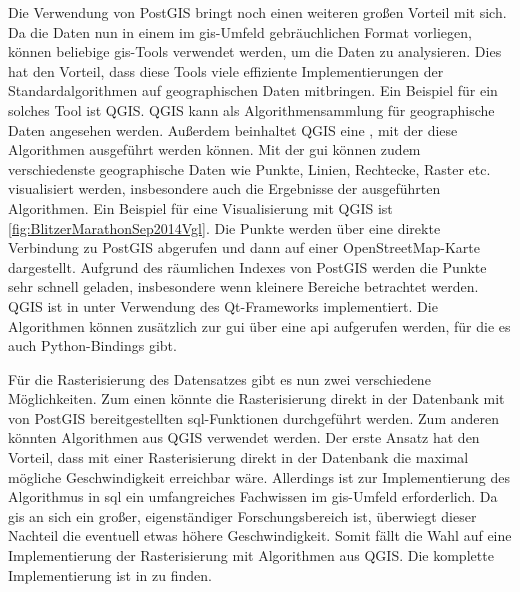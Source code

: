 Die Verwendung von PostGIS bringt noch einen weiteren großen Vorteil mit sich.
Da die Daten nun in einem im \acrshort{gis}-Umfeld gebräuchlichen Format vorliegen, können beliebige \acrshort{gis}-Tools verwendet werden, um die Daten zu analysieren.
Dies hat den Vorteil, dass diese Tools viele effiziente Implementierungen der Standardalgorithmen auf geographischen Daten mitbringen.
Ein Beispiel für ein solches Tool ist QGIS.
QGIS kann als Algorithmensammlung für geographische Daten angesehen werden.
Außerdem beinhaltet QGIS eine , mit der diese Algorithmen ausgeführt werden können.
Mit der \acrshort{gui} können zudem verschiedenste geographische Daten wie Punkte, Linien, Rechtecke, Raster etc. visualisiert werden, insbesondere auch die Ergebnisse der ausgeführten Algorithmen.
Ein Beispiel für eine Visualisierung mit QGIS ist \autoref{fig:BlitzerMarathonSep2014Vgl}.
Die Punkte werden über eine direkte Verbindung zu PostGIS abgerufen und dann auf einer OpenStreetMap-Karte dargestellt.
Aufgrund des räumlichen Indexes von PostGIS werden die Punkte sehr schnell geladen, insbesondere wenn kleinere Bereiche betrachtet werden.
QGIS ist in \Cpp unter Verwendung des Qt-Frameworks implementiert.
Die Algorithmen können zusätzlich zur \acrshort{gui} über eine \Cpp\acrshort{api} aufgerufen werden, für die es auch Python-Bindings gibt.

Für die Rasterisierung des Datensatzes gibt es nun zwei verschiedene Möglichkeiten.
Zum einen könnte die Rasterisierung direkt in der Datenbank mit von PostGIS bereitgestellten \acrshort{sql}-Funktionen durchgeführt werden.
Zum anderen könnten Algorithmen aus QGIS verwendet werden.
Der erste Ansatz hat den Vorteil, dass mit einer Rasterisierung direkt in der Datenbank die maximal mögliche Geschwindigkeit erreichbar wäre.
Allerdings ist zur Implementierung des Algorithmus in \acrshort{sql} ein umfangreiches Fachwissen im \acrshort{gis}-Umfeld erforderlich.
Da \acrshort{gis} an sich ein großer, eigenständiger Forschungsbereich ist, überwiegt dieser Nachteil die eventuell etwas höhere Geschwindigkeit.
Somit fällt die Wahl auf eine Implementierung der Rasterisierung mit Algorithmen aus QGIS.
Die komplette Implementierung ist in  zu finden.

